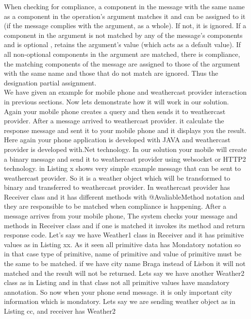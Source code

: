 When checking for compliance, a component in the message with the same name as a component in the operation’s argument matches it and can be assigned to it (if the message complies with the argument, as a whole). If not, it is ignored. If a component in the argument is not matched by any of the message’s components and is optional , retains the argument’s value (which acts as a default value). If all non-optional  components in the argument are matched, there is compliance, the matching components of the message are assigned to those of the argument with the same name and those that do not match are ignored. Thus the designation partial assignment.\\

We have given an example for mobile phone and weathercast provider interaction in previous sections. Now lets demonstrate how it will work in our solution. Again your mobile phone creates a query and then sends it to weathercast provider. After a message arrived to weathercast provider. it calculate the response message and sent it to your mobile phone and it displays you the result. Here again your phone application is developed with JAVA and weathercast provider is developed with.Net technology. In our solution your mobile will create a binary message and send it to weathercast provider using websocket or HTTP2 technology. in Listing x shows very simple example message that can be sent to weathercast provider. So it is a weather object which will be transformed to binary and transferred to weathercast provider. In weathercast provider has Receiver class and it has different methods with @AvaliableMethod notation and they are responsible to be matched when compliance is happening. After a message arrives from your mobile phone, The system checks your message and methods in Receiver class and if one is matched it invokes its method and return response code. Let's say we have Weather1 class in Receiver and it has primitive values as in Listing xx. As it seen all primitive data has Mondatory notation so in that case type of primitive, name of primitive and value of primitive must be the same to be matched. if we have city name Braga instead of Lisbon it will not matched and the result will not be returned. Lets say we have another Weather2 class as in Listing and in that class not all primitive values have mandatory annotation. So now when your phone send message. it is only important city information which is mondatory. Lets say we are sending weather object as in Listing cc, and receiver has Weather2      


